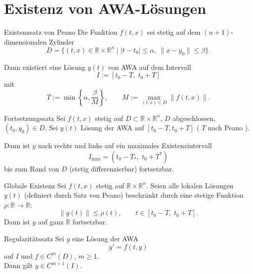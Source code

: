 \newpage
\section{Existenz von AWA-Lösungen}
\label{5.2}

\begin{satz}{Existenzsatz von Peano}
    Die Funktion $f(t,x)$ sei stetig auf dem $(n+1)$-dimensionalen Zylinder
    $$
    D=\{(t,x)\in\mathbb{R}\times\mathbb{R}^n \mid |t-t_0|\le\alpha,\ \lVert x-y_0\rVert\le\beta\}.
    $$

    Dann existiert eine Lösung $y(t)$ von AWA auf dem Intervall
    $$
    I:= [t_0-T,\; t_0+T]
    $$
    mit
    $$
    T:=\min\!\left\{\alpha,\frac{\beta}{M}\right\},\qquad 
    M:=\max_{(t,x)\in D}\lVert f(t,x)\rVert.
    $$    
\end{satz}

\begin{satz}{Fortsetzungssatz}
    Sei $f(t,x)$ stetig auf $D\subset\mathbb{R}\times\mathbb{R}^n$, $D$ abgeschlossen, $(t_0,y_0)\in D$.
    Sei $y(t)$ Lösung der AWA auf $[t_0-T,t_0+T]$ ( $T$ nach Peano ).
    \vspace{1em}
    
    Dann ist $y$ nach rechts und links auf ein maximales Existenzintervall
    $$
    I_{\max}=(t_0-T_*,\;t_0+T^*)
    $$
    bis zum Rand von $D$ (stetig differenzierbar) fortsetzbar.   
\end{satz}

\begin{korollar}{Globale Existenz}
    Sei $f(t,x)$ stetig auf $\mathbb{R}\times\mathbb{R}^n$. Seien alle lokalen Lösungen $y(t)$ (definiert durch Satz von Peano) beschränkt durch eine stetige Funktion $\rho:\mathbb{R}\to\mathbb{R}$:
    $$
    \|y(t)\| \le \rho(t),\qquad t\in [t_0-T,\; t_0+T].
    $$
    Dann ist $y$ auf ganz $\mathbb{R}$ fortsetzbar.  
\end{korollar}

\begin{satz}{Regularitätssatz}
    Sei $y$ eine Lösung der AWA
    $$
    y' = f(t,y)
    $$
    auf $I$ und $f\in C^{m}(D)$, $m\ge 1$.\\

    Dann gilt $y\in C^{m+1}(I)$.    
\end{satz}